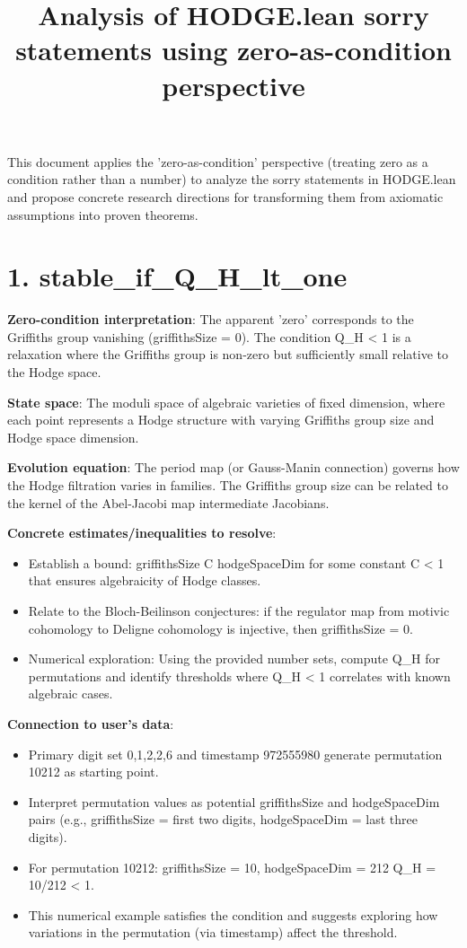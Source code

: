 \documentclass[11pt]{article}
\title{Analysis of HODGE.lean sorry statements using zero-as-condition perspective}
\author{}
\date{}
\begin{document}
\maketitle
This document applies the 'zero-as-condition' perspective (treating zero as a condition rather than a number) to analyze the sorry statements in HODGE.lean and propose concrete research directions for transforming them from axiomatic assumptions into proven theorems.

\section{1. stable\_if\_Q\_H\_lt\_one}

\textbf{Zero-condition interpretation}: The apparent 'zero' corresponds to the Griffiths group vanishing (griffithsSize = 0). The condition Q\_H < 1 is a relaxation where the Griffiths group is non-zero but sufficiently small relative to the Hodge space.

\textbf{State space}: The moduli space of algebraic varieties of fixed dimension, where each point represents a Hodge structure with varying Griffiths group size and Hodge space dimension.

\textbf{Evolution equation}: The period map (or Gauss-Manin connection) governs how the Hodge filtration varies in families. The Griffiths group size can be related to the kernel of the Abel-Jacobi map intermediate Jacobians.

\textbf{Concrete estimates/inequalities to resolve}:
\begin{itemize}
\item Establish a bound: griffithsSize \leq C \cdot hodgeSpaceDim for some constant C < 1 that ensures algebraicity of Hodge classes.
\item Relate to the Bloch-Beilinson conjectures: if the regulator map from motivic cohomology to Deligne cohomology is injective, then griffithsSize = 0.
\item Numerical exploration: Using the provided number sets, compute Q\_H for permutations and identify thresholds where Q\_H < 1 correlates with known algebraic cases.
\end{itemize}

\textbf{Connection to user's data}:
\begin{itemize}
\item Primary digit set {0,1,2,2,6} and timestamp 972555980 generate permutation 10212 as starting point.
\item Interpret permutation values as potential griffithsSize and hodgeSpaceDim pairs (e.g., griffithsSize = first two digits, hodgeSpaceDim = last three digits).
\item For permutation 10212: griffithsSize = 10, hodgeSpaceDim = 212 \rightarrow Q\_H = 10/212  < 1.
\item This numerical example satisfies the condition and suggests exploring how variations in the permutation (via timestamp) affect the threshold.
\end{itemize}
\end{document}
